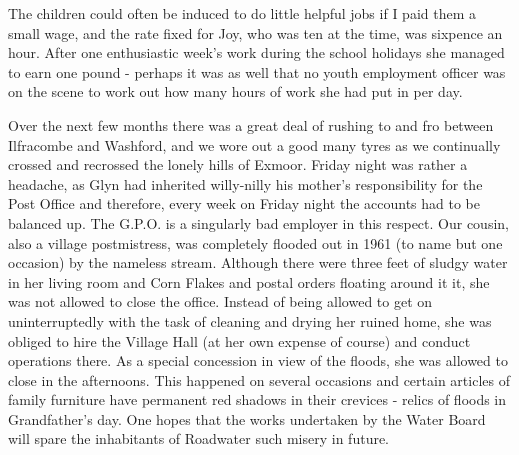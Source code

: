 The children could often be induced to do little helpful jobs if I paid them a small wage, and the rate fixed for Joy, who was ten at the time, was sixpence an hour. After one enthusiastic week's work during the school holidays she managed to earn one pound - perhaps it was as well that no youth employment officer was on the scene to work out how many hours of work she had put in per day.

Over the next few months there was a great deal of rushing to and fro between Ilfracombe and Washford, and we wore out a good many tyres as we continually crossed and recrossed the lonely hills of Exmoor. Friday night was rather a headache, as Glyn had inherited willy-nilly his mother's responsibility for the Post Office and therefore, every week on Friday night the accounts had to be balanced up. The G.P.O. is a singularly bad employer in this respect. Our cousin, also a village postmistress, was completely flooded out in 1961 (to name but one occasion) by the nameless stream. Although there were three feet of sludgy water in her living room and Corn Flakes and postal orders floating around it it, she was not allowed to close the office. Instead of being allowed to get on uninterruptedly with the task of cleaning and drying her ruined home, she was obliged to hire the Village Hall (at her own expense of course) and conduct operations there. As a special concession in view of the floods, she was allowed to close in the afternoons. This happened on several occasions and certain articles of family furniture have permanent red shadows in their crevices - relics of floods in Grandfather's day. One hopes that the works undertaken by the Water Board will spare the inhabitants of Roadwater such misery in future.

